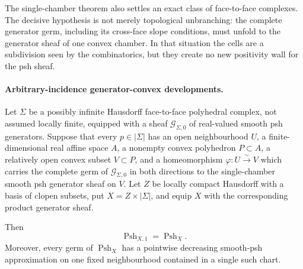 The single-chamber theorem also settles an exact class of face-to-face
complexes.  The decisive hypothesis is not merely topological
unbranching: the complete generator germ, including its cross-face slope
conditions, must unfold to the generator sheaf of one convex chamber.  In
that situation the cells are a subdivision seen by the combinatorics, but
they create no new positivity wall for the psh sheaf.

\begin{theorem}
\label{thm:p071-generator-convex-polyhedral-complex-collapse}
\begingroup
\hfuzz=3pt

\endgroup
\end{theorem}



\paragraph{Arbitrary-incidence generator-convex developments.}
\begin{corollary}
\label{cor:p071-locally-finite-generator-convex-collapse}
Let $\Sigma$ be a possibly infinite Hausdorff face-to-face polyhedral
complex, not assumed locally finite, equipped with a sheaf
$\mathcal G_{\Sigma,0}$ of real-valued smooth psh generators.  Suppose
that every $p\in|\Sigma|$ has an open neighbourhood $U$, a
finite-dimensional real affine space $A$, a nonempty convex polyhedron
$P\subset A$, a relatively open convex subset $V\subset P$, and a
homeomorphism $\varphi:U\xrightarrow{\sim}V$ which carries the complete
germ of $\mathcal G_{\Sigma,0}$ in both directions to the
single-chamber smooth psh generator sheaf on $V$.  Let $Z$ be locally
compact Hausdorff with a basis of clopen subsets, put
$X=Z\times|\Sigma|$, and equip $X$ with the corresponding product
generator sheaf.

Then
\[
                    \operatorname{Psh}_{X,1}
                    =\operatorname{Psh}_X.
\]
Moreover, every germ of $\operatorname{Psh}_X$ has a pointwise decreasing
smooth-psh approximation on one fixed neighbourhood contained in a single
such chart.
\end{corollary}

